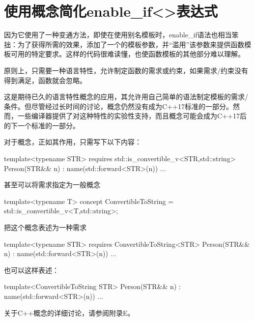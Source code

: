 \section{使用概念简化enable\_if<>表达式}
因为它使用了一种变通方法，即使在使用别名模板时，enable\_if语法也相当笨拙：为了获得所需的效果，添加了一个的模板参数，并“滥用”该参数来提供函数模板可用的特定要求。这样的代码很难读懂，也使函数模板的其他部分难以理解。

原则上，只需要一种语言特性，允许制定函数的需求或约束，如果需求/约束没有得到满足，函数就会忽略。

这是期待已久的语言特性概念的应用，其允许用自己简单的语法制定模板的需求/条件。但尽管经过长时间的讨论，概念仍然没有成为C++17标准的一部分。然而，一些编译器提供了对这种特性的实验性支持，而且概念可能会成为C++17后的下一个标准的一部分。

对于概念，正如其作用，只需写下以下内容：

\begin{cpp}
template<typename STR>
requires std::is_convertible_v<STR,std::string>
Person(STR&& n) : name(std::forward<STR>(n)) {
	...
}
\end{cpp}

甚至可以将需求指定为一般概念

\begin{cpp}
template<typename T>
concept ConvertibleToString = std::is_convertible_v<T,std::string>;
\end{cpp}

把这个概念表述为一种需求

\begin{cpp}
template<typename STR>
requires ConvertibleToString<STR>
Person(STR&& n) : name(std::forward<STR>(n)) {
	...
}
\end{cpp}

也可以这样表述：

\begin{cpp}
template<ConvertibleToString STR>
Person(STR&& n) : name(std::forward<STR>(n)) {
	...
}
\end{cpp}

关于C++概念的详细讨论，请参阅附录E。




















